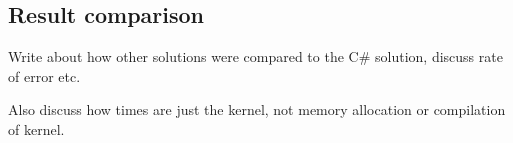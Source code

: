\subsection{Result comparison}\label{subsec:result_comparison}
Write about how other solutions were compared to the C\# solution, discuss rate of error etc.

Also discuss how times are just the kernel, not memory allocation or compilation of kernel.